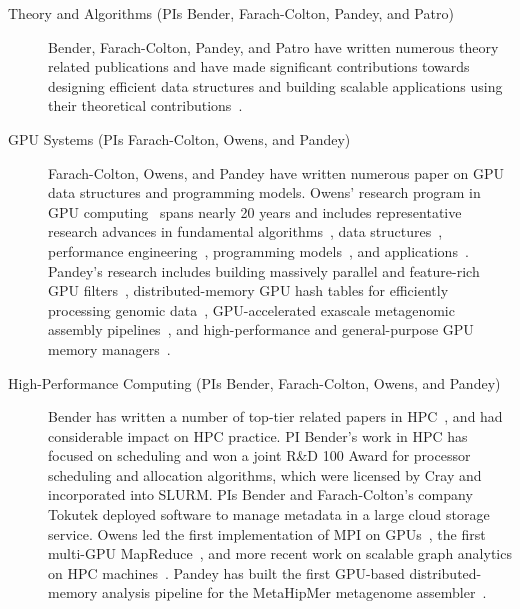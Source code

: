 \begin{description}%
    \item[Theory and Algorithms (PIs Bender, Farach-Colton, Pandey, and Patro)]
    Bender, Farach-Colton, Pandey, and Patro have written numerous theory related publications and have made significant contributions towards designing efficient data structures and building scalable applications using their theoretical contributions~\cite{BenderFaGo18,BenderFaJo12,PandeyBJ17,PandeyAlBe18,PandeyBJP17,PandeyBeJo17b,ConwayFaSh18,JannenYuZh15a,JannenYuZh15b,YuanZhJa16,pandey2021terrace,pandey2021variantstore,PandeyBeCo23,Assadi2023,Bender2023,pandey2020timely,PandeyCDBFJ21,mccoy2022high,Almodaresi2018Pufferfish,fan2023spt,Khan2021,Khan2022,Khan2023CapsSA,fan2023fulgor,Pibiri2023MacDBG}.

    \item[GPU Systems (PIs Farach-Colton, Owens, and Pandey)] Farach-Colton, Owens, and Pandey have written numerous paper on GPU data structures and programming models. Owens' research program in GPU computing~\cite{Owens:2007:ASO,Owens:2008:GC} spans nearly 20 years and includes representative research advances in fundamental algorithms~\cite{Sengupta:2007:SPF}, data structures~\cite{Lefohn:2006:GGE,Alcantara:2009:RPH}, %
    performance engineering~\cite{Zhang:2011:AQP}, programming models~\cite{Gupta:2012:ASO, Tzeng:2010:TMF}, and applications~\cite{Wang:2017:GGG}. Pandey's research includes building massively parallel and feature-rich GPU filters~\cite{mccoy2022high}, distributed-memory GPU hash tables for efficiently processing genomic data~\cite{nisa2021distributed}, GPU-accelerated exascale metagenomic assembly pipelines~\cite{McCoyHYP23a}, and high-performance and general-purpose GPU memory managers~\cite{McCoyP24}.

    \item[High-Performance Computing (PIs Bender, Farach-Colton, Owens, and
        Pandey)] Bender has
      written a number of top-tier related papers in HPC~\cite{pandey2020timely,bender2017two,eckstein2015pebbl,agrawal1989four,bender2008communication,greenberg1999enabling},
      and had considerable impact on HPC practice.
      PI Bender's work in HPC has focused on scheduling and  won a joint R\&D 100 Award for processor scheduling and allocation algorithms, which were licensed by Cray and incorporated into SLURM\@.  PIs Bender and Farach-Colton's company Tokutek deployed software to manage metadata in a large cloud storage service. Owens led the first implementation of MPI on GPUs~\cite{Stuart:2009:MPO:withouturl,Stuart:2011:EMT}, the first multi-GPU MapReduce~\cite{Stuart:2011:MMO}, and more recent work on scalable graph analytics on HPC machines~\cite{Pan:2018:SBS,Pan:2017:MGA,Chen:2022:SIP}. Pandey has built the first GPU-based distributed-memory \kmer analysis pipeline for the MetaHipMer metagenome assembler~\cite{nisa2021distributed}.


\end{description}
